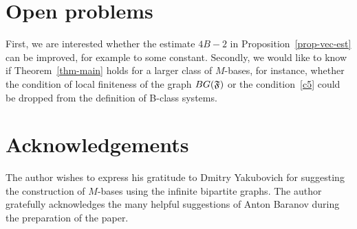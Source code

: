 \documentclass[12pt,oneside,a4paper]{amsart}
\begin{document}
  \section{Open problems}
    First, we are interested whether the estimate $4B - 2$ in Proposition~\ref{prop-vec-est} can be improved, for example to some constant.
    Secondly, we would like to know if Theorem~\ref{thm-main} holds for a larger class of $M$-bases, for instance, whether the condition of
      local finiteness of the graph $BG(\mathfrak{F})$ or the condition~\ref{c5} could be dropped from the definition of B-class systems.
  \section{Acknowledgements}
    The author wishes to express his gratitude to Dmitry Yakubovich for suggesting the construction of $M$-bases using the infinite bipartite graphs.
    The author gratefully acknowledges the many helpful suggestions of Anton Baranov during the preparation of the paper.

\end{document}
